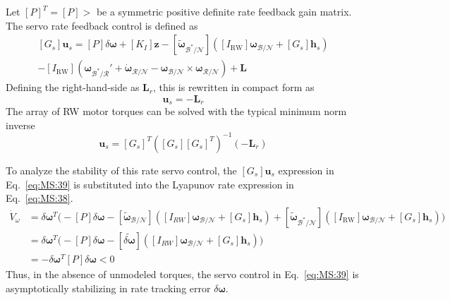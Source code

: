 \documentclass[]{BasiliskReportMemo}
\begin{document}
Let $[P]^{T} = [P]>$ be a symmetric positive definite rate feedback gain matrix.  The servo rate feedback control is defined as
\begin{multline}
	\label{eq:MS:39}
	[G_{s}]\bm u_{s} = [P]\delta\bm\omega + [K_{I}]\bm z - [\tilde{\bm\omega}_{\mathcal{B}^{\ast}/\mathcal{N}}]
	\left( [I_{\text{RW}}] \bm\omega_{\mathcal{B}/\mathcal{N}} + [G_{s}] \bm h_{s} \right)
	\\
	- [I_{\text{RW}}](\bm\omega_{\mathcal{B}^{\ast}/\mathcal{R}} ' +  \dot{\bm\omega}_{\mathcal{R}/\mathcal{N}} -  {\bm\omega}_{\mathcal{B}/\mathcal{N}} \times  \bm\omega_{\mathcal{R}/\mathcal{N}}) + \bm L
\end{multline}
Defining the right-hand-side as $\bm L_{r}$, this is rewritten in compact form as
\begin{equation}
	[G_{s}]\bm u_{s} = -\bm L_{r}
\end{equation}
The array of RW motor torques can be solved with the typical minimum norm inverse
\begin{equation}
	\bm u_{s} = [G_{s}]^{T}\left( [G_{s}][G_{s}]^{T}\right)^{-1} (- \bm L_{r})
\end{equation}


To analyze the stability of this rate servo control, the $[G_{s}]\bm u_{s}$ expression in Eq.~\eqref{eq:MS:39} is substituted into the Lyapunov rate expression in Eq.~\eqref{eq:MS:38}.
\begin{align}
	\label{eq:MS:42}
	\dot V_{\omega} &= \delta\bm\omega^{T} \Big(
		- [P]\delta\bm\omega - [\tilde{\bm \omega}_{\mathcal{B}/\mathcal{N}}] \left(
	[I_{RW}] \bm\omega_{\mathcal{B}/\mathcal{N}} + [G_{s}] \bm h_{s}
	\right)
	+ [\tilde{\bm\omega}_{\mathcal{B}^{\ast}/\mathcal{N}}]
	\left( [I_{\text{RW}}] \bm\omega_{\mathcal{B}/\mathcal{N}} + [G_{s}] \bm h_{s} \right)
	\Big )
	\nonumber \\
	&= \delta\bm\omega^{T} \Big( - [P]\delta\bm\omega
	- [\widetilde{\delta\bm \omega}] \left(
	[I_{RW}] \bm\omega_{\mathcal{B}/\mathcal{N}} + [G_{s}] \bm h_{s}
	\right)
	\Big )
	\nonumber \\
	&= - \delta\bm\omega ^{T} [P] \delta\bm\omega < 0
\end{align}
Thus, in the absence of unmodeled torques, the servo control in Eq.~\eqref{eq:MS:39} is asymptotically stabilizing in rate tracking error $\delta\bm\omega$.
\end{document}
